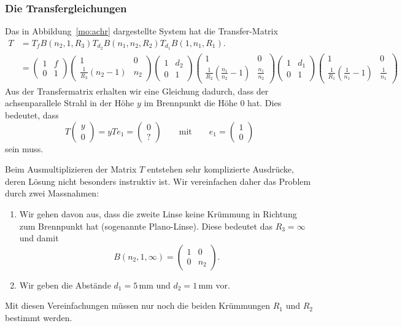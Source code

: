 \subsubsection{Die Transfergleichungen}
Das in Abbildung~\ref{mo:achr} dargestellte System hat die
Transfer-Matrix
\begin{align*}
T
&=
T_f
B(n_2,1,R_3)
T_{d_2}
B(n_1,n_2,R_2)
T_{d_1}
B(1,n_1,R_1).
\\
&=
\begin{pmatrix}1&f\\0&1\end{pmatrix}
\begin{pmatrix} 1&0\\\frac{1}{R_3}\left(n_2-1\right)&n_2\end{pmatrix}
\begin{pmatrix}1&d_2\\0&1\end{pmatrix}
\begin{pmatrix} 1&0\\\frac{1}{R_2}\left(\frac{n_1}{n_2}-1\right)&\frac{n_1}{n_2} \end{pmatrix}
\begin{pmatrix}1&d_1\\0&1\end{pmatrix}
\begin{pmatrix} 1&0\\\frac{1}{R_1}\left(\frac{1}{n_1}-1\right)&\frac{1}{n_1} \end{pmatrix}
\end{align*}
Aus der Transfermatrix erhalten wir eine Gleichung dadurch, dass der
achsenparallele Strahl in der Höhe $y$ im Brennpunkt die Höhe $0$ hat.
Dies bedeutet, dass
\[
T\begin{pmatrix}y\\0\end{pmatrix}
=
yTe_1
=
\begin{pmatrix}0\\?\end{pmatrix}
\qquad\text{mit}\qquad
e_1 = \begin{pmatrix}1\\0\end{pmatrix}
\]
sein muss.

Beim Ausmultiplizieren der Matrix $T$ entstehen sehr komplizierte Ausdrücke,
deren Lösung nicht besonders instruktiv ist.
Wir vereinfachen daher das Problem durch zwei Massnahmen:
\begin{enumerate}
\item Wir gehen davon aus, dass die zweite Linse keine Krümmung in Richtung
zum Brennpunkt hat (sogenannte Plano-Linse).
Diese bedeutet das $R_3=\infty$ und damit
\[
B(n_2,1,\infty)= \begin{pmatrix} 1&0\\0&n_2\end{pmatrix}.
\]
\item
Wir geben die Abstände $d_1=5\,\text{mm}$ und $d_2=1\,\text{mm}$ vor.
\end{enumerate}
Mit diesen Vereinfachungen müssen nur noch die beiden Krümmungen $R_1$ 
und $R_2$ bestimmt werden.

